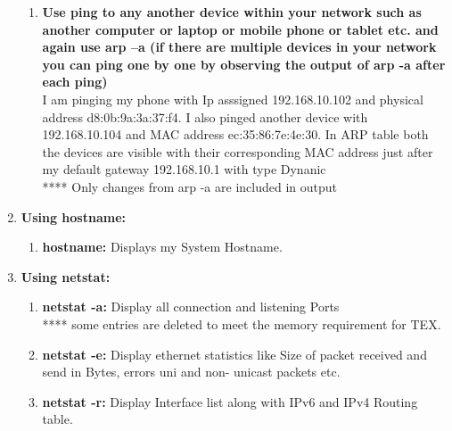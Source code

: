 \documentclass[a4paper,12pt]{article}
\begin{document}
\begin{enumerate}
\begin{enumerate}
              \item \textbf{Use ping to any another device within your network such as another computer or laptop
                        or mobile phone or tablet etc. and again use arp –a (if there are multiple devices in your
                        network you can ping one by one by observing the output of arp -a after each ping)}\\
                    I am pinging my phone with Ip asssigned 192.168.10.102 and physical address d8:0b:9a:3a:37:f4.
                    I also pinged another device with 192.168.10.104 and  MAC address ec:35:86:7e:4e:30.
                    In ARP table both the devices are visible with their corresponding MAC address
                    just after my default gateway 192.168.10.1 with type Dynanic\\
                    **** Only changes from arp -a are included in output

          \end{enumerate}

    \item \textbf{Using hostname:}
          \begin{enumerate}
              \item \textbf{hostname:} Displays my System Hostname.


          \end{enumerate}

    \item \textbf{Using netstat:}
          \begin{enumerate}
              \item \textbf{netstat -a:} Display all connection and listening Ports\\
                    **** some entries are deleted  to meet the memory requirement for TEX.

              \item \textbf{netstat -e:}
                    Display ethernet statistics like Size of packet received and send in Bytes,
                    errors uni and non- unicast packets etc.

              \item \textbf{netstat -r:}
                    Display Interface list along with IPv6 and IPv4 Routing table.


\end{enumerate}
\end{enumerate}
\end{document}
